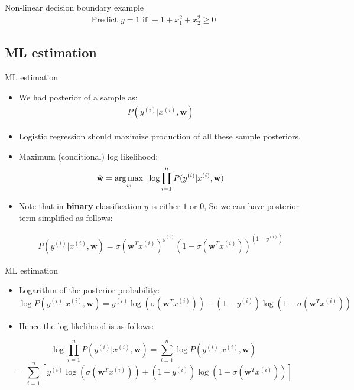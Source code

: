 \documentclass[serif, aspectratio=169]{beamer}
\begin{document}
\begin{frame}{Non-linear decision boundary example}
    \begin{align*}
        \text{Predict } y=1 \text{ if } -1 + x_1^2 + x_2^2 \geq 0
    \end{align*}
    
\end{frame}
\subsection{ML estimation}

\begin{frame}{ML estimation}
    \begin{itemize}
        \item We had posterior of a sample as:
        \begin{align*}
            P(y^{(i)}|x^{(i)},\mathbf{w})
        \end{align*}
        \item Logistic regression should maximize production of all these sample posteriors.
        
        \item Maximum (conditional) log likelihood:
        \begin{align*}
             \mathbf{\hat{w}} = \underset{w}{\arg\max} \hspace{0.2cm} \log \prod_{i=1}^{n} P(y^{(i)}|x^{(i)},\mathbf{w})
        \end{align*}
        \item Note that in \textbf{binary} classification $y$ is either $1$ or $0$, So we can have posterior term simplified as follows:
        
        \begin{align*}
            P(y^{(i)}|x^{(i)},\mathbf{w})=\sigma (\mathbf{w}^Tx^{(i)})^{y^{(i)}} (1 - \sigma (\mathbf{w}^T x^{(i)}))^{(1 - y^{(i)})}
        \end{align*}
    \end{itemize}
\end{frame}
\begin{frame}{ML estimation}
    \begin{itemize}
        \item Logarithm of the posterior probability:
            \[
            \log P(y^{(i)}|x^{(i)}, \mathbf{w})=
            y^{(i)}\log (\sigma (\mathbf{w} ^T x^{(i)})) + 
            (1-y^{(i)})\log (1 - \sigma (\mathbf{w}^T x^{(i)}))
            \]
        \item Hence the log likelihood is as follows:
    \end{itemize}
    \[
    \log \prod _{i=1}^{n} P(y^{(i)}|x^{(i)}, \mathbf{w}) = \sum  _{i=1}^{n} \log P(y^{(i)}|x^{(i)}, \mathbf{w})
    \]
    \[
    = \sum_{i=1}^{n}[y^{(i)}\log ( \sigma (\mathbf{w} ^T x^{(i)})) + 
    (1-y^{(i)})\log (1 - \sigma (\mathbf{w} ^ T x^{(i)}))]
    \]
\end{frame}
\end{document}

